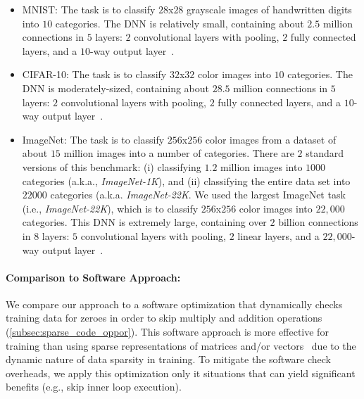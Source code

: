 \begin{itemize}
\item MNIST: The task is to classify $28$x$28$ grayscale images of handwritten digits into $10$ categories. The DNN is relatively small, containing about $2.5$ million connections in $5$ layers: $2$ convolutional layers with pooling, $2$ fully connected layers, and a $10$-way output layer~\cite{Chilimbi14}.

\item CIFAR-10: The task is to classify $32$x$32$ color images into $10$ categories.  The DNN is moderately-sized, containing about $28.5$ million connections in $5$  layers: $2$ convolutional layers with pooling, $2$ fully connected layers, and a $10$-way output layer~\cite{Krizhevsky12}.

\item ImageNet:  The task is to classify $256$x$256$ color images from  a dataset of about $15$ million images into a number of categories.  There are $2$ standard versions of this benchmark: (i) classifying $1.2$ million images into $1000$ categories (a.k.a., {\it ImageNet-1K}), and (ii) classifying the entire data set into $22000$ categories (a.k.a. {\it ImageNet-22K}. We used the largest ImageNet task (i.e., {\it ImageNet-22K}), which is to classify $256$x$256$ color images into $22,000$ categories.  This DNN is extremely large, containing over $2$ billion connections in $8$ layers: $5$ convolutional layers with pooling, $2$ linear layers, and a $22,000$-way output layer~\cite{Chilimbi14}. 
\end{itemize}
           
 \paragraph{Comparison to Software Approach:}
 We compare our approach to a software optimization that dynamically checks training data for zeroes in order to skip multiply and addition operations (\ref{subsec:sparse_code_oppor}).  This software approach is more effective for training than using sparse representations of matrices and/or vectors~\cite{IntelSparseMatrix} due to the dynamic nature of data sparsity in training.  To mitigate the software check overheads, we apply this optimization only it situations that can yield significant benefits (e.g., skip inner loop execution).


